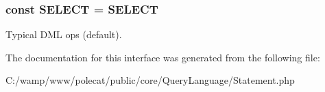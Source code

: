 \subsubsection[{S\+E\+L\+E\+C\+T}]{\setlength{\rightskip}{0pt plus 5cm}const S\+E\+L\+E\+C\+T = \textquotesingle{}S\+E\+L\+E\+C\+T\textquotesingle{}}\label{interface_able_polecat___query_language___statement_interface_a35973b14dbe24cfc841a4f19db764f28}
Typical D\+M\+L ops (default). 

The documentation for this interface was generated from the following file\+:\begin{DoxyCompactItemize}
\item 
C\+:/wamp/www/polecat/public/core/\+Query\+Language/Statement.\+php\end{DoxyCompactItemize}
